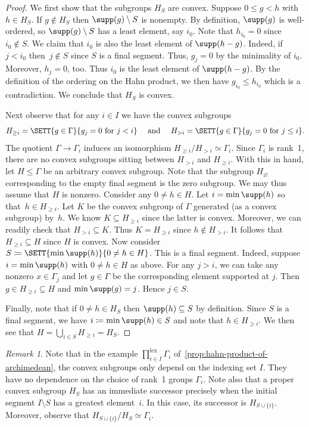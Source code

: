 \documentclass{amsart}
\numberwithin{equation}{section}%
\theoremstyle{remark}
\newtheorem{Rem}[equation]{Remark}
\renewcommand{\emptyset}{\varnothing}
\begin{document}
\begin{proof}
	We first show that the subgroups $H_S$ are convex. Suppose $0 \le g < h$ with $h \in H_S$. If $ g\not\in H_S$ then $\supp(g) \setminus S$ is nonempty. By definition, $\supp(g)$ is well-ordered, so $\supp(g)\setminus S$ has a least element, say $i_0$. Note that $h_{i_0} = 0$ since $i_0 \not\in S$. We claim that $i_0$ is also the least element of $\supp(h-g)$. Indeed, if $j < i_0$ then~$j \not\in S$ since $S$ is a final segment. Thus, $g_j = 0$ by the minimality of $i_0$. Moreover, $h_j = 0$, too. Thus $i_0$ is the least element of $\supp(h-g)$. By the definition of the ordering on the Hahn product, we then have $g_{i_0} \le h_{i_0}$ which is a contradiction. We conclude that $H_S$ is convex.

	Next observe that for any $i \in I$ we have the convex subgroups 
	\[
		H_{\ge i} = \SETT{g \in \Gamma}{g_j = 0 \text{ for } j < i}
			\quad\text{ and }\quad
		H_{> i} = \SETT{g \in \Gamma}{g_j = 0 \text{ for } j \le i}.
	\]
	The quotient $\Gamma \to \Gamma_i$ induces an isomorphism $H_{\ge i}/H_{> i} \simeq \Gamma_i$. Since $\Gamma_i$ is rank~1, there are no convex subgroups sitting between $H_{> i}$ and $H_{\ge i}$. With this in hand, let $H \le \Gamma$ be an arbitrary convex subgroup. Note that the subgroup $H_\emptyset$ corresponding to the empty final segment is the zero subgroup. We may thus assume that $H$ is nonzero. Consider any $0 \neq h \in H$. Let $i = \min\supp(h)$ so that~$h \in H_{\ge i}$. Let $K$ be the convex subgroup of $\Gamma$ generated (as a convex subgroup) by~$h$. We know $K \subseteq H_{\ge i}$ since the latter is convex. Moreover, we can readily check that $H_{> i} \subseteq K$. Thus $K=H_{\ge i}$ since $h \not\in H_{>i}$. It follows that $H_{\ge i} \subseteq H$ since $H$ is convex. Now consider $S\coloneqq \SETT{\min \supp(h)}{0\neq h \in H}$. This is a final segment. Indeed, suppose $i = \min\supp(h)$ with $0\neq h \in H$ as above. For any $j > i$, we can take any nonzero $x \in\Gamma_j$ and let $g \in \Gamma$ be the corresponding element supported at $j$. Then $g \in H_{\ge i} \subseteq H$ and $\min\supp(g)=j$. Hence $j \in S$.

	Finally, note that if $0 \neq h \in H_S$ then $\supp(h) \subseteq S$ by definition. Since $S$ is a final segment, we have $i \coloneqq \min\supp(h) \in S$ and note that $h \in H_{\ge i}$. We then see that $H = \bigcup_{i \in S} H_{\ge i} = H_S$.
\end{proof}

\begin{Rem}\label{rem:convex-of-rank-one-product}
	Note that in the example $\prod_{i \in I}^{\mathrm{lex}} \Gamma_i$ of~\cref{prop:hahn-product-of-archimedean}, the convex subgroups only depend on the indexing set $I$. They have no dependence on the choice of rank~1 groups $\Gamma_i$. Note also that a proper convex subgroup $H_S$ has an immediate successor precisely when the initial segment $I \setminus S$ has a greatest element~$i$. In this case, its successor is $H_{S \cup \{i\}}$. Moreover, observe that $H_{S \cup \{i\}} / H_S \simeq \Gamma_i$.
\end{Rem}
\end{document}
